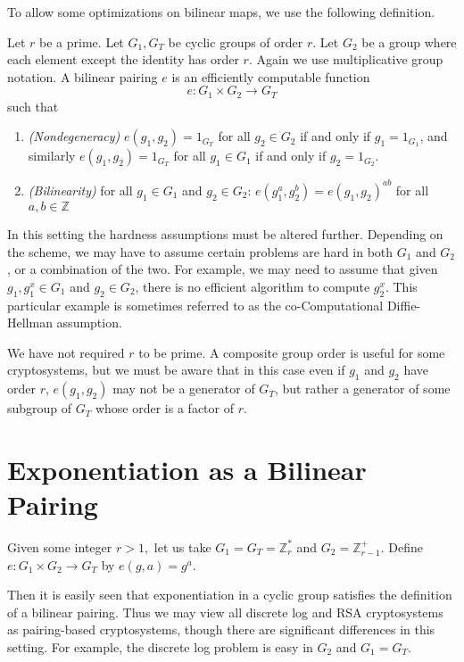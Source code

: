To allow some optimizations on bilinear maps,
we use the following definition.

Let $r$ be a prime.
Let $G_1, G_T$ be cyclic groups of order $r$.
Let $G_2$ be a group where each element except the identity has order $r$.
Again we use multiplicative group notation.
A bilinear pairing $e$ is an efficiently computable function
\[
e:G_1 \times G_2 \rightarrow G_T
\]
such that
\begin{enumerate}
\item
\emph{(Nondegeneracy)}
$e(g_1,g_2) = 1_{G_T}$ for all $g_2 \in G_2$ if and only if $g_1 = 1_{G_1}$,
and similarly 
$e(g_1,g_2) = 1_{G_T}$ for all $g_1 \in G_1$ if and only if $g_2 = 1_{G_2}$.
\item
\emph{(Bilinearity)}
for all $g_1 \in G_1$ and $g_2 \in G_2$:
$e(g_1^a, g_2^b) = e(g_1,g_2)^{a b}$ for all $a, b \in \mathbb{Z}$
\end{enumerate}

In this setting the hardness assumptions must be altered further.
Depending on the scheme, we may have to assume certain problems are hard in
both $G_1$ and $G_2$, or a combination of the two. For example, we may
need to assume that given $g_1, g_1^x \in G_1$ and $g_2 \in G_2$,
there is no efficient algorithm to compute $g_2^x$. This particular
example is sometimes referred to as
the co-Computational Diffie-Hellman assumption.

We have not required $r$ to be prime. A composite group
order is useful for some cryptosystems\cite{bgn},
but we must be aware that in this case even if $g_1$ and $g_2$ have order
$r$, $e(g_1, g_2)$ may not be a generator of $G_T$, but rather a generator
of some subgroup of $G_T$ whose order is a factor of $r$.

\section{Exponentiation as a Bilinear Pairing}

Given some integer $r > 1,$
let us take $G_1 = G_T = \mathbb{Z}_r^*$ and $G_2 = \mathbb{Z}_{r-1}^+$.
Define $e:G_1\times G_2 \rightarrow G_T$ by $e(g, a)= g^a$.

Then it is easily seen that exponentiation in a cyclic group satisfies
the definition of a bilinear
pairing. Thus we may view all discrete log and RSA cryptosystems
as pairing-based cryptosystems, though there are significant differences
in this setting. For example, the discrete log problem is easy
in $G_2$ and $G_1 = G_T$.

